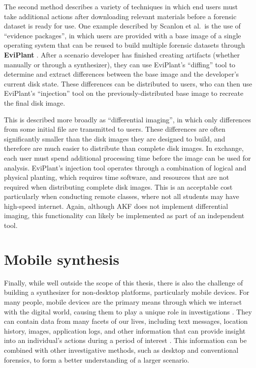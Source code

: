 \documentclass[letterpaper,12pt]{report}
\begin{document}
The second method describes a variety of techniques in which end users
must take additional actions after downloading relevant materials before
a forensic dataset is ready for use. One example described by Scanlon et
al.~is the use of ``evidence packages'', in which users are provided
with a base image of a single operating system that can be reused to
build multiple forensic datasets through \textbf{EviPlant}
\cite{scanlonEviPlantEfficientDigital2017}. After a scenario
developer has finished creating artifacts (whether manually or through a
synthesizer), they can use EviPlant's ``diffing'' tool to determine and
extract differences between the base image and the developer's current
disk state. These differences can be distributed to users, who can then
use EviPlant's ``injection'' tool on the previously-distributed base
image to recreate the final disk image.

This is described more broadly as ``differential imaging'', in which
only differences from some initial file are transmitted to users. These
differences are often significantly smaller than the disk images they
are designed to build, and therefore are much easier to distribute than
complete disk images. In exchange, each user must spend additional
processing time before the image can be used for analysis. EviPlant's
injection tool operates through a combination of logical and physical
planting, which requires time software, and resources that are not
required when distributing complete disk images. This is an acceptable
cost particularly when conducting remote classes, where not all students
may have high-speed internet. Again, although AKF does not implement
differential imaging, this functionality can likely be implemented as
part of an independent tool.

\section{Mobile synthesis}\label{mobile-synthesis}

Finally, while well outside the scope of this thesis, there is also the
challenge of building a synthesizer for non-desktop platforms,
particularly mobile devices. For many people, mobile devices are the
primary means through which we interact with the digital world, causing
them to play a unique role in investigations
\cite{chernyshevMobileForensicsAdvances2017}. They can contain data
from many facets of our lives, including text messages, location
history, images, application logs, and other information that can
provide insight into an individual's actions during a period of interest
\cite{sutiknoCapabilitiesCellebriteUniversal2024}. This information
can be combined with other investigative methods, such as desktop and
conventional forensics, to form a better understanding of a larger
scenario.
\end{document}

